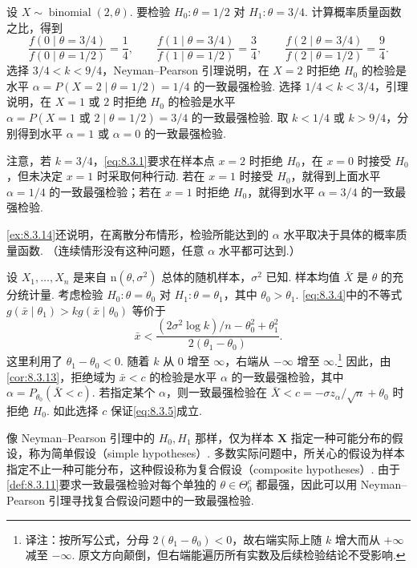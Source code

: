 \begin{example}[二项总体的一致最强检验]\label{ex:8.3.14}
设 $X\sim\operatorname{binomial}(2,\theta)$. 要检验 $H_0:\theta=1/2$ 对 $H_1:\theta=3/4$. 计算概率质量函数之比，得到
$$\frac{f(0\mid\theta=3/4)}{f(0\mid\theta=1/2)}=\frac14,\qquad
\frac{f(1\mid\theta=3/4)}{f(1\mid\theta=1/2)}=\frac34,\qquad
\frac{f(2\mid\theta=3/4)}{f(2\mid\theta=1/2)}=\frac94.$$
选择 $3/4<k<9/4$，Neyman–Pearson 引理说明，在 $X=2$ 时拒绝 $H_0$ 的检验是水平 $\alpha=P(X=2\mid\theta=1/2)=1/4$ 的一致最强检验. 选择 $1/4<k<3/4$，引理说明，在 $X=1$ 或 $2$ 时拒绝 $H_0$ 的检验是水平 $\alpha=P(X=1\text{ 或 }2\mid\theta=1/2)=3/4$ 的一致最强检验. 取 $k<1/4$ 或 $k>9/4$，分别得到水平 $\alpha=1$ 或 $\alpha=0$ 的一致最强检验.

注意，若 $k=3/4$，\eqref{eq:8.3.1}要求在样本点 $x=2$ 时拒绝 $H_0$，在 $x=0$ 时接受 $H_0$，但未决定 $x=1$ 时采取何种行动. 若在 $x=1$ 时接受 $H_0$，就得到上面水平 $\alpha=1/4$ 的一致最强检验；若在 $x=1$ 时拒绝 $H_0$，就得到水平 $\alpha=3/4$ 的一致最强检验.
\end{example}
\autoref{ex:8.3.14}还说明，在离散分布情形，检验所能达到的 $\alpha$ 水平取决于具体的概率质量函数. （连续情形没有这种问题，任意 $\alpha$ 水平都可达到.）
\begin{example}[正态总体的一致最强检验]\label{ex:8.3.15}
设 $X_1,\ldots,X_n$ 是来自 $\mathrm n(\theta,\sigma^2)$ 总体的随机样本，$\sigma^2$ 已知. 样本均值 $\bar X$ 是 $\theta$ 的充分统计量. 考虑检验 $H_0:\theta=\theta_0$ 对 $H_1:\theta=\theta_1$，其中 $\theta_0>\theta_1$. \eqref{eq:8.3.4}中的不等式 $g(\bar x\mid\theta_1)>kg(\bar x\mid\theta_0)$ 等价于
$$\bar x<\frac{(2\sigma^2\log k)/n-\theta_0^2+\theta_1^2}{2(\theta_1-\theta_0)}.$$
这里利用了 $\theta_1-\theta_0<0$. 随着 $k$ 从 $0$ 增至 $\infty$，右端从 $-\infty$ 增至 $\infty$.\footnote{译注：按所写公式，分母 $2(\theta_1-\theta_0)<0$，故右端实际上随 $k$ 增大而从 $+\infty$ 减至 $-\infty$. 原文方向颠倒，但右端能遍历所有实数及后续检验结论不受影响.} 因此，由\autoref{cor:8.3.13}，拒绝域为 $\bar x<c$ 的检验是水平 $\alpha$ 的一致最强检验，其中 $\alpha=P_{\theta_0}(\bar X<c)$. 若指定某个 $\alpha$，则一致最强检验在 $\bar X<c=-\sigma z_\alpha/\sqrt n+\theta_0$ 时拒绝 $H_0$. 如此选择 $c$ 保证\eqref{eq:8.3.5}成立.
\end{example}
像 Neyman–Pearson 引理中的 $H_0,H_1$ 那样，仅为样本 $\boldsymbol X$ 指定一种可能分布的假设，称为简单假设（simple hypotheses\mbox{）.} 多数实际问题中，所关心的假设为样本指定不止一种可能分布，这种假设称为复合假设（composite hypotheses\mbox{）.} 由于\autoref{def:8.3.11}要求一致最强检验对每个单独的 $\theta\in\Theta_0^c$ 都最强，因此可以用 Neyman–Pearson 引理寻找复合假设问题中的一致最强检验.

